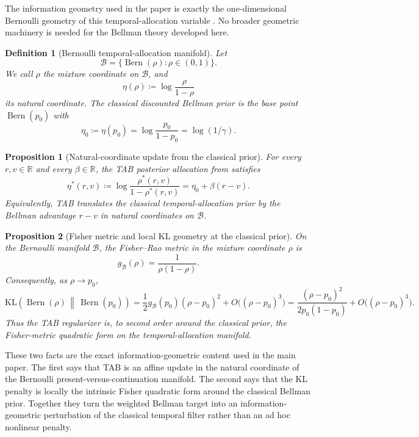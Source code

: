\documentclass{article}
\newtheorem{proposition}[proposition]{Proposition}
\newtheorem{definition}[definition]{Definition}
\theoremstyle{remark}
\DeclareMathOperator{\Bern}{Bern}
\newcommand{\R}{\mathbb{R}}
\newcommand{\KL}{\mathrm{KL}}
\newcommand{\defeq}{\coloneqq}
\newcommand{\cB}{\mathcal{B}}
\newcommand{\pprior}{p_0}
\newcommand{\KLbin}[2]{\KL\!\left(\Bern(#1)\,\middle\|\,\Bern(#2)\right)}
\begin{document}
The information geometry used in the paper is exactly the one-dimensional Bernoulli geometry of this temporal-allocation variable \citep{amari2000methods,amari2016information}. No broader geometric machinery is needed for the Bellman theory developed here.

\begin{definition}[Bernoulli temporal-allocation manifold]
\label{def:bernoulli-manifold}
Let
\[
\cB
=
\{\Bern(\rho): \rho\in(0,1)\}.
\]
We call $\rho$ the mixture coordinate on $\cB$, and
\[
\eta(\rho) \defeq \log\frac{\rho}{1-\rho}
\]
its natural coordinate. The classical discounted Bellman prior is the base point $\Bern(\pprior)$ with
\[
\eta_0 \defeq \eta(\pprior)=\log\frac{\pprior}{1-\pprior}=\log(1/\gamma).
\]
\end{definition}

\begin{proposition}[Natural-coordinate update from the classical prior]
\label{prop:natural-coordinate-update}
For every $r,v\in\R$ and every $\beta\in\R$, the TAB posterior allocation from  satisfies
\[
\eta^*(r,v)
\defeq
\log\frac{\rho^*(r,v)}{1-\rho^*(r,v)}
=
\eta_0 + \beta(r-v).
\]
Equivalently, TAB translates the classical temporal-allocation prior by the Bellman advantage $r-v$ in natural coordinates on $\cB$.
\end{proposition}

\begin{proposition}[Fisher metric and local KL geometry at the classical prior]
\label{prop:fisher-local-kl}
On the Bernoulli manifold $\cB$, the Fisher--Rao metric in the mixture coordinate $\rho$ is
\[
g_{\cB}(\rho)=\frac{1}{\rho(1-\rho)}.
\]
Consequently, as $\rho\to \pprior$,
\[
\KLbin{\rho}{\pprior}
=
\frac{1}{2}g_{\cB}(\pprior)(\rho-\pprior)^2 + O\bigl((\rho-\pprior)^3\bigr)
=
\frac{(\rho-\pprior)^2}{2\pprior(1-\pprior)} + O\bigl((\rho-\pprior)^3\bigr).
\]
Thus the TAB regularizer is, to second order around the classical prior, the Fisher-metric quadratic form on the temporal-allocation manifold.
\end{proposition}

These two facts are the exact information-geometric content used in the main paper. The first says that TAB is an affine update in the natural coordinate of the Bernoulli present-versus-continuation manifold. The second says that the KL penalty is locally the intrinsic Fisher quadratic form around the classical Bellman prior. Together they turn the weighted Bellman target into an information-geometric perturbation of the classical temporal filter rather than an ad hoc nonlinear penalty.
\end{document}
